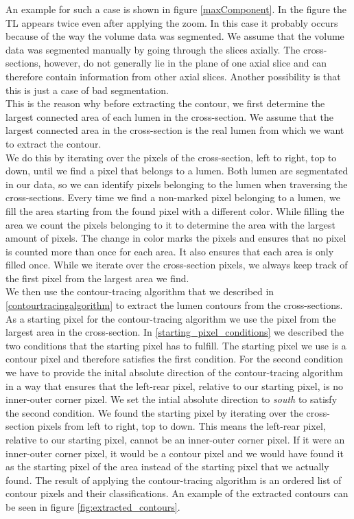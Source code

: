 \documentclass[thesis.tex]{subfiles}
\begin{document}
An example for such a case is shown in figure \ref{maxComponent}. In the figure the TL appears twice even after applying the zoom. In this case it probably occurs because of the way the volume data was segmented. We assume that the volume data was segmented manually by going through the slices axially. The cross-sections, however, do not generally lie in the plane of one axial slice and can therefore contain information from other axial slices. Another possibility is that this is just a case of bad segmentation.  \\
This is the reason why before extracting the contour, we first determine the largest connected area of each lumen in the cross-section. We assume that the largest connected area in the cross-section is the real lumen from which we want to extract the contour. \\ We do this by iterating over the pixels of the cross-section, left to right, top to down, until we find a pixel that belongs to a lumen. Both lumen are segmentated in our data, so we can identify pixels belonging to the lumen when traversing the cross-sections. Every time we find a non-marked pixel belonging to a lumen, we fill the area starting from the found pixel with a different color. While filling the area we count the pixels belonging to it to determine the area with the largest amount of pixels. The change in color marks the pixels and ensures that no pixel is counted more than once for each area. It also ensures that each area is only filled once. While we iterate over the cross-section pixels, we always keep track of the first pixel from the largest area we find.\\   

We then use the contour-tracing algorithm that we described in \ref{contourtracingalgorithm} to extract the lumen contours from the cross-sections. As a starting pixel for the contour-tracing algorithm we use the pixel from the largest area in the cross-section. In \ref{starting_pixel_conditions} we described the two conditions that the starting pixel has to fulfill. The starting pixel we use is a contour pixel and therefore satisfies the first condition. For the second condition we have to provide the inital absolute direction of the contour-tracing algorithm in a way that ensures that the left-rear pixel, relative to our starting pixel, is no inner-outer corner pixel. We set the intial absolute direction to \textit{south} to satisfy the second condition. We found the starting pixel by iterating over the cross-section pixels from left to right, top to down. This means the left-rear pixel, relative to our starting pixel, cannot be an inner-outer corner pixel. If it were an inner-outer corner pixel, it would be a contour pixel and we would have found it as the starting pixel of the area instead of the starting pixel that we actually found. The result of applying the contour-tracing algorithm is an ordered list of contour pixels and their classifications.
An example of the extracted contours can be seen in figure \ref{fig:extracted_contours}.
\end{document}
